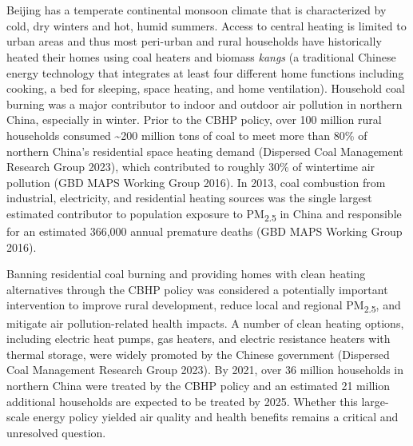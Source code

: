 \documentclass[
  letterpaper,
  DIV=11,
  numbers=noendperiod]{scrartcl}
\providecommand{\DIFaddtex}[1]{{\protect\color{blue}\uwave{#1}}} %
\providecommand{\DIFaddbegin}{} %
\providecommand{\DIFaddend}{} %
\providecommand{\DIFdelbegin}{} %
\providecommand{\DIFdelend}{} %
\providecommand{\DIFadd}[1]{\texorpdfstring{\DIFaddtex{#1}}{#1}} %
\newcommand{\DIFscaledelfig}{0.5}
\newlength{\DIFdelgraphicswidth} %
\newlength{\DIFdelgraphicsheight} %
\newcommand{\DIFaddincludegraphics}[2][]{{\color{blue}\fbox{\DIFOincludegraphics[#1]{#2}}}} %
\newcommand{\DIFdelincludegraphics}[2][]{%
\sbox{\DIFdelgraphicsbox}{\DIFOincludegraphics[#1]{#2}}%
\settoboxwidth{\DIFdelgraphicswidth}{\DIFdelgraphicsbox} %
\settoboxtotalheight{\DIFdelgraphicsheight}{\DIFdelgraphicsbox} %
\scalebox{\DIFscaledelfig}{%
\parbox[b]{\DIFdelgraphicswidth}{\usebox{\DIFdelgraphicsbox}\\[-\baselineskip] \rule{\DIFdelgraphicswidth}{0em}}\llap{\resizebox{\DIFdelgraphicswidth}{\DIFdelgraphicsheight}{%
\setlength{\unitlength}{\DIFdelgraphicswidth}%
\begin{picture}(1,1)%
\thicklines\linethickness{2pt} %
{\color[rgb]{1,0,0}\put(0,0){\framebox(1,1){}}}%
{\color[rgb]{1,0,0}\put(0,0){\line( 1,1){1}}}%
{\color[rgb]{1,0,0}\put(0,1){\line(1,-1){1}}}%
\end{picture}%
}\hspace*{3pt}}} %
} %
\DeclareRobustCommand{\DIFaddbegin}{\DIFOaddbegin \let\includegraphics\DIFaddincludegraphics} %
\DeclareRobustCommand{\DIFaddend}{\DIFOaddend \let\includegraphics\DIFOincludegraphics} %
\DeclareRobustCommand{\DIFdelbegin}{\DIFOdelbegin \let\includegraphics\DIFdelincludegraphics} %
\DeclareRobustCommand{\DIFdelend}{\DIFOaddend \let\includegraphics\DIFOincludegraphics} %
\begin{document}
\DIFdelbegin %
\DIFdelend \DIFaddbegin \section{\DIFadd{Background}}\label{background}
\DIFaddend 

\DIFdelbegin %
\DIFdelend \DIFaddbegin \subsection{\DIFadd{Context for the policy}}\label{context-for-the-policy}
\DIFaddend 

Beijing has a temperate continental monsoon climate that is
characterized by cold, dry winters and hot, humid summers. Access to
central heating is limited to urban areas and thus most peri-urban and
rural households have historically heated their homes using coal heaters
and biomass \emph{kangs} (a traditional Chinese energy technology that
integrates at least four different home functions including cooking, a
bed for sleeping, space heating, and home ventilation). Household coal
burning was a major contributor to indoor and outdoor air pollution in
northern China, especially in winter. Prior to the CBHP policy, over 100
million rural households consumed \textasciitilde200 million tons of
coal to meet more than 80\% of northern China's residential space
heating demand (Dispersed Coal Management Research Group 2023), which
contributed to roughly 30\% of wintertime air pollution (GBD MAPS
Working Group 2016). In 2013, coal combustion from industrial,
electricity, and residential heating sources was the single largest
estimated contributor to population exposure to PM\textsubscript{2.5} in
China and responsible for an estimated 366,000 annual premature deaths
(GBD MAPS Working Group 2016).

Banning residential coal burning and providing homes with clean heating
alternatives through the CBHP policy was considered a potentially
important intervention to improve rural development, reduce local and
regional PM\textsubscript{2.5}, and mitigate air pollution-related
health impacts. A number of clean heating options, including electric
heat pumps, gas heaters, and electric resistance heaters with thermal
storage, were widely promoted by the Chinese government (Dispersed Coal
Management Research Group 2023). By 2021, over 36 million households in
northern China were treated by the CBHP policy and an estimated 21
million additional households are expected to be treated by 2025.
Whether this large-scale energy policy yielded air quality and health
benefits remains a critical and unresolved question.
\end{document}
